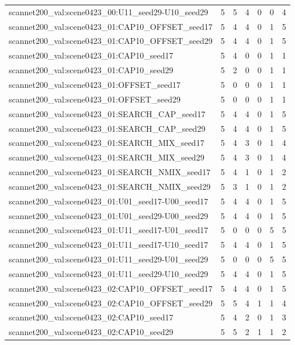 \begin{table}[t]
\begin{tabular}{lrrrrrr}
scannet200\_val:scene0423\_00:U11\_seed29-U10\_seed29 & 5 & 5 & 4 & 0 & 0 & 4 \\
scannet200\_val:scene0423\_01:CAP10\_OFFSET\_seed17 & 5 & 4 & 4 & 0 & 1 & 5 \\
scannet200\_val:scene0423\_01:CAP10\_OFFSET\_seed29 & 5 & 4 & 4 & 0 & 1 & 5 \\
scannet200\_val:scene0423\_01:CAP10\_seed17 & 5 & 4 & 0 & 0 & 1 & 1 \\
scannet200\_val:scene0423\_01:CAP10\_seed29 & 5 & 2 & 0 & 0 & 1 & 1 \\
scannet200\_val:scene0423\_01:OFFSET\_seed17 & 5 & 0 & 0 & 0 & 1 & 1 \\
scannet200\_val:scene0423\_01:OFFSET\_seed29 & 5 & 0 & 0 & 0 & 1 & 1 \\
scannet200\_val:scene0423\_01:SEARCH\_CAP\_seed17 & 5 & 4 & 4 & 0 & 1 & 5 \\
scannet200\_val:scene0423\_01:SEARCH\_CAP\_seed29 & 5 & 4 & 4 & 0 & 1 & 5 \\
scannet200\_val:scene0423\_01:SEARCH\_MIX\_seed17 & 5 & 4 & 3 & 0 & 1 & 4 \\
scannet200\_val:scene0423\_01:SEARCH\_MIX\_seed29 & 5 & 4 & 3 & 0 & 1 & 4 \\
scannet200\_val:scene0423\_01:SEARCH\_NMIX\_seed17 & 5 & 4 & 1 & 0 & 1 & 2 \\
scannet200\_val:scene0423\_01:SEARCH\_NMIX\_seed29 & 5 & 3 & 1 & 0 & 1 & 2 \\
scannet200\_val:scene0423\_01:U01\_seed17-U00\_seed17 & 5 & 4 & 4 & 0 & 1 & 5 \\
scannet200\_val:scene0423\_01:U01\_seed29-U00\_seed29 & 5 & 4 & 4 & 0 & 1 & 5 \\
scannet200\_val:scene0423\_01:U11\_seed17-U01\_seed17 & 5 & 0 & 0 & 0 & 5 & 5 \\
scannet200\_val:scene0423\_01:U11\_seed17-U10\_seed17 & 5 & 4 & 4 & 0 & 1 & 5 \\
scannet200\_val:scene0423\_01:U11\_seed29-U01\_seed29 & 5 & 0 & 0 & 0 & 5 & 5 \\
scannet200\_val:scene0423\_01:U11\_seed29-U10\_seed29 & 5 & 4 & 4 & 0 & 1 & 5 \\
scannet200\_val:scene0423\_02:CAP10\_OFFSET\_seed17 & 5 & 4 & 4 & 0 & 1 & 5 \\
scannet200\_val:scene0423\_02:CAP10\_OFFSET\_seed29 & 5 & 5 & 4 & 1 & 1 & 4 \\
scannet200\_val:scene0423\_02:CAP10\_seed17 & 5 & 4 & 2 & 0 & 1 & 3 \\
scannet200\_val:scene0423\_02:CAP10\_seed29 & 5 & 5 & 2 & 1 & 1 & 2 \\

\end{tabular}
\end{table}
